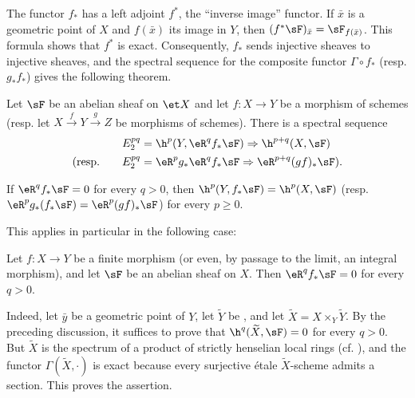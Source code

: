 The functor $f_*$ has a left adjoint $f^*$, the “inverse image” functor.
If $\bar x$ is a geometric point of $X$ and $f(\bar x)$ its image in
$Y$, then $(f^*\sF)_{\bar x}=\sF_{f(\bar x)}$. This formula shows that
$f^*$ is exact. Consequently, $f_*$ sends injective sheaves to injective
sheaves, and the spectral sequence for the composite functor
$\Gamma\circ f_*$ (resp. $g_*f_*$) gives the following theorem.

\begin{theorem}\label{I:2-3-4}
Let $\sF$ be an abelian sheaf on $\et X$ and let $f:X\to Y$ be a
morphism of schemes (resp. let
$X\xrightarrow fY\xrightarrow gZ$ be morphisms of schemes). There is a
spectral sequence
\begin{align*}
  E_2^{pq} &= \h^p(Y,\eR^q f_* \sF) \Rightarrow \h^{p+q}(X,\sF) \\
  \text{(resp.}\qquad E_2^{pq} &= \eR^p g_* \eR^q f_* \sF \Rightarrow \eR^{p+q}(gf)_* \sF\text{).}
\end{align*}
\end{theorem}

\begin{corollary}\label{I:2-3-5}
If $\eR^qf_*\sF=0$ for every $q>0$, then
$\h^p(Y,f_*\sF)=\h^p(X,\sF)$ (resp.
$\eR^pg_*(f_*\sF)=\eR^p(gf)_*\sF$) for every $p\geqslant0$.
\end{corollary}

This applies in particular in the following case:

\begin{proposition}\label{I:2-3-6}
Let $f:X\to Y$ be a finite morphism (or even, by passage to the limit,
an integral morphism), and let $\sF$ be an abelian sheaf on $X$. Then
$\eR^qf_*\sF=0$ for every $q>0$.
\end{proposition}

Indeed, let $\bar y$ be a geometric point of $Y$, let $\widetilde Y$ be
, and let
$\widetilde X=X\times_Y\widetilde Y$. By the preceding discussion, it
suffices to prove that $\h^q(\widetilde X,\sF)=0$ for every $q>0$. But
$\widetilde X$ is the spectrum of a product of strictly henselian local
rings (cf. ), and the functor
$\Gamma(\widetilde X,\cdot)$ is exact because every surjective étale
$\widetilde X$-scheme admits a section. This proves the assertion.

